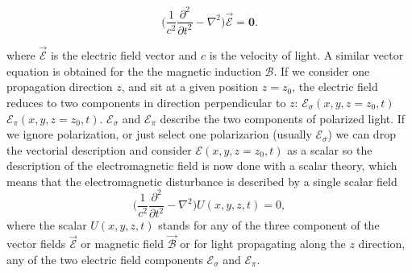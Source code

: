 \documentclass{iucr}              %
\begin{document}
\begin{equation}\label{eq: d'Alembert electric field}
	\Big( \frac{1}{c^2} \frac{\partial^2}{\partial t^2}-\nabla^2\Big) \vec{\mathcal{E}} = \bm{0}.
\end{equation}


where $\vec{\mathcal{E}}$ is the electric field vector and $c$ is the velocity of light. A similar vector equation is obtained for the the magnetic induction $\mathcal{B}$. If we consider one propagation direction $z$, and sit at a given position $z=z_0$, the electric field reduces to two components in direction perpendicular to $z$: $\mathcal{E}_\sigma(x,y,z=z_0,t)$ $\mathcal{E}_\pi(x,y,z=z_0,t)$. $\mathcal{E}_\sigma$ and $\mathcal{E}_\pi$ describe the two components of polarized light. If we ignore polarization, or just select one polarizarion (usually $\mathcal{E}_\sigma$) we can drop the vectorial description and consider $\mathcal{E}(x,y,z=z_0,t)$ as a scalar so the description of the electromagnetic field is now done with a scalar theory, which means that the electromagnetic disturbance is described by a single scalar field
\begin{equation}\label{eq: d'Alembert scalar field}
\Big(\frac{1}{c^2} \frac{\partial^2}{\partial t^2}-\nabla^2\Big) U(x,y,z,t) = 0,
\end{equation}
where the scalar $U(x,y,z,t)$ stands for any of the three component of the vector fields $\vec{\mathcal{E}}$ or magnetic field $\vec{\mathcal{B}}$ or for light propagating along the $z$ direction, any of the two electric field components $\mathcal{E}_\sigma$ and $\mathcal{E}_\pi$. 
\end{document}
